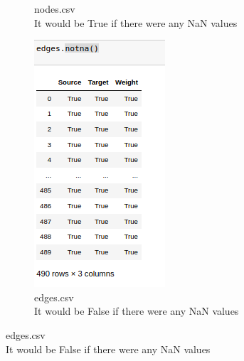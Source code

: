 \documentclass[12pt]{article}
\begin{document}
\begin{figure}[ht]
\begin{subfigure}[b]{0.24\textwidth}
				\caption{nodes.csv\\
				\tiny {It would be True if there were any NaN values}}
				\label{fig:1}
			\end{subfigure}
			\hfill 
			\begin{subfigure}[b]{0.282\textwidth}
				\includegraphics[width=\textwidth]{edgessnan}
				\caption{edges.csv\\
				\tiny {It would be False if there were any NaN values}}
				\label{fig:2}
			\end{subfigure}
		\end{figure}
		\FloatBarrier
\end{document}
